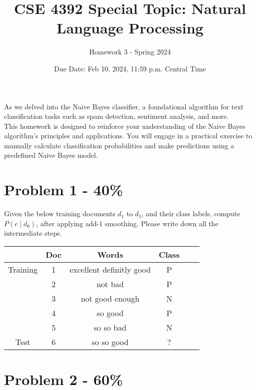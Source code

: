 \documentclass{article}
\begin{document}
\title{CSE 4392 Special Topic: Natural Language Processing}
\author{Homework 3 - Spring 2024}
\date{Due Date: Feb 10, 2024, 11:59 p.m. Central Time}
\maketitle
\thispagestyle{fancy}




As we delved into the Naive Bayes classifier, a foundational algorithm for text classification tasks such as spam detection, sentiment analysis, and more.\\
\newline
This homework is designed to reinforce your understanding of the Naive Bayes algorithm's principles and applications. You will engage in a practical exercise to manually calculate classification probabilities and make predictions using a predefined Naive Bayes model.\\

\section*{Problem 1 - 40\%}
Given the below training documents $d_1$ to $d_5$, and their class labels, compute ${P(c \mid d_{6})}$, after applying add-1 smoothing. Please write down all the intermediate steps.

\begin{center}
    \begin{tabular}{|c|c|c|c|c|c|}
    \hline
     & Doc & Words & Class \\ \hline
    Training & 1 & excellent definitly good & P \\ \hline
            & 2 & not bad & P \\ \hline
            & 3 & not good enough & N \\ \hline
            & 4 & so good & P \\ \hline
            & 5 & so so bad & N \\ \hline
    Test    & 6 & so so good & ? \\ \hline
    \end{tabular}
\end{center}

\newpage

\section*{Problem 2 - 60\%}
\end{document}
